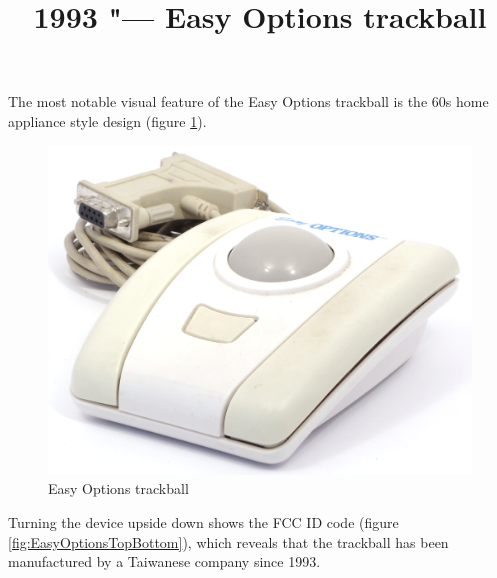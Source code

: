 \documentclass[11pt, a4paper]{article}
\begin{document}
\title{1993 "--- Easy Options trackball}
\date{}
\maketitle

The most notable visual feature of the Easy Options trackball is the 60s home appliance style design (figure \ref{fig:EasyOptionsPic}).

\begin{figure}[h]
    \centering
    \includegraphics[scale=0.7]{1993_easy_options_trackball/pic_60.jpg}
    \caption{Easy Options trackball}
    \label{fig:EasyOptionsPic}
\end{figure}

Turning the device upside down shows the FCC ID code (figure \ref{fig:EasyOptionsTopBottom}), which reveals that the trackball has been manufactured by a Taiwanese company since 1993.
\end{document}
